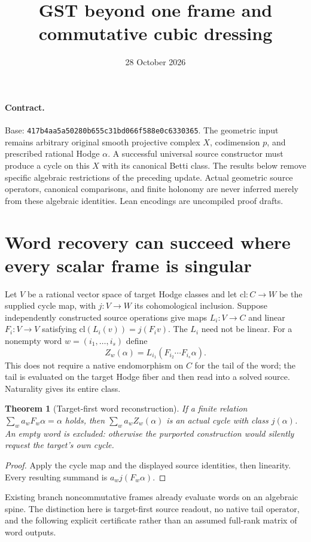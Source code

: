 \documentclass[11pt]{article}
\title{GST beyond one frame and commutative cubic dressing}
\date{28 October 2026}
\newtheorem{theorem}{Theorem}
\begin{document}
\maketitle
\paragraph{Contract.}
Base: \texttt{417b4aa5a50280b655c31bd066f588e0c6330365}.
The geometric input remains arbitrary original smooth projective complex
$X$, codimension $p$, and prescribed rational Hodge $\alpha$. A successful
universal source constructor must produce a cycle on this $X$ with its
canonical Betti class. The results below remove specific algebraic
restrictions of the preceding update. Actual geometric source operators,
canonical comparisons, and finite holonomy are never inferred merely from
these algebraic identities. Lean encodings are uncompiled proof drafts.

\section{Word recovery can succeed where every scalar frame is singular}
Let $V$ be a rational vector space of target Hodge classes and let
$\mathrm{cl}:C\to W$ be the supplied cycle map, with $j:V\to W$ its
cohomological inclusion. Suppose independently constructed source operations
give maps $L_i:V\to C$ and linear $F_i:V\to V$ satisfying
$\mathrm{cl}(L_i(v))=j(F_i v)$. The $L_i$ need not be linear.
For a nonempty word $w=(i_1,\ldots,i_s)$ define
\[
 Z_w(\alpha)=L_{i_1}(F_{i_2}\cdots F_{i_s}\alpha).
\]
This does not require a native endomorphism on $C$ for the tail of the word;
the tail is evaluated on the target Hodge fiber and then read into a solved
source. Naturality gives its entire class.
\begin{theorem}[Target-first word reconstruction]
If a finite relation $\sum_w a_w F_w\alpha=\alpha$ holds, then
$\sum_w a_w Z_w(\alpha)$ is an actual cycle with class $j(\alpha)$.
An empty word is excluded: otherwise the purported construction would
silently request the target's own cycle.
\end{theorem}
\begin{proof}
Apply the cycle map and the displayed source identities, then linearity.
Every resulting summand is $a_w j(F_w\alpha)$.
\end{proof}
Existing branch noncommutative frames already evaluate words on an algebraic
spine. The distinction here is target-first source readout, no native tail
operator, and the following explicit certificate rather than an assumed
full-rank matrix of word outputs.
\end{document}
